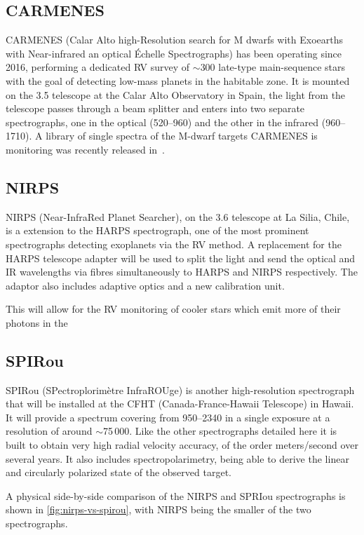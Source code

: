 \subsection{CARMENES}
\label{subsec:carmenes}
{CARMENES} (Calar Alto high-Resolution search for M dwarfs with Exoearths with Near-infrared an optical \'Echelle Spectrographs) has been operating since 2016, performing a dedicated {RV} survey of \(\sim\)300 late-type main-sequence stars with the goal of detecting low-mass planets in the habitable zone.
It is mounted on the 3.5\m{} telescope at the Calar Alto Observatory in Spain, the light from the telescope passes through a beam splitter and enters into two separate spectrographs, one in the optical (520--960\nm{}) and the other in the infrared (960--1710\nm{}).
A library of single spectra of the {M-dwarf} targets {CARMENES} is monitoring was recently released in~\citet{reiners_carmenes_2018}.

\subsection{NIRPS}
\label{subsec:nirps}
{NIRPS} (Near-InfraRed Planet Searcher), on the 3.6\m{} telescope at La Silia, Chile, is a \nir{} extension to the {HARPS} spectrograph, one of the most prominent spectrographs detecting exoplanets via the {RV} method.
A replacement for the {HARPS} telescope adapter will be used to split the light and send the optical and {IR} wavelengths via fibres simultaneously to {HARPS} and {NIRPS} respectively.
The adaptor also includes adaptive optics and a new calibration unit.

This will allow for the {RV} monitoring of cooler stars which emit more of their photons in the 

\subsection{SPIRou}
\label{subsec:spirou}
{SPIRou} (SPectroplorim\`etre InfraROUge) is another high-resolution \nir{} spectrograph that will be installed at the {CFHT} (Canada-France-Hawaii Telescope) in Hawaii.
It will provide a spectrum covering from 950--2340\nm{} in a single exposure at a resolution of around \(\sim\)75\,000.
Like the other spectrographs detailed here it is built to obtain very high radial velocity accuracy, of the order meters/second over several years.
It also includes spectropolarimetry, being able to derive the linear and circularly polarized state of the observed target.

A physical side-by-side comparison of the {NIRPS} and {SPRIou} spectrographs is shown in \cref{fig:nirps-vs-spirou}, with {NIRPS} being the smaller of the two spectrographs.

